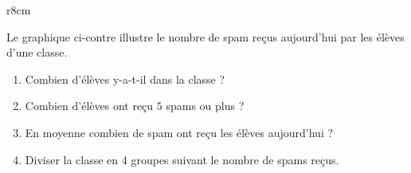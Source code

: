 

\begin{wrapfigure}[5]{r}{8cm}
   \vspace{-0.5cm}        %
   \centering
   
\end{wrapfigure}

Le graphique ci-contre illustre le nombre de spam reçus aujourd'hui par les élèves d'une classe.
\begin{enumerate}
    \item
        Combien d'élèves y-a-t-il dans la classe ?
    \item
        Combien d'élèves ont reçu \( 5\) spams ou plus ?
    \item
        En moyenne combien de spam ont reçu les élèves aujourd'hui ?
    \item
        Diviser la classe en 4 groupes suivant le nombre de spams reçus.
\end{enumerate}


